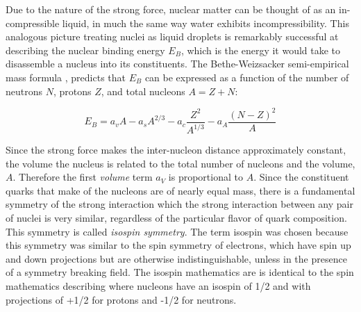 Due to the nature of the strong force, nuclear matter can be thought of as an in-compressible liquid, in much the same way water exhibits incompressibility. This analogous picture treating nuclei as liquid droplets is remarkably successful at describing the nuclear binding energy $E_{B}$, which is the energy it would take to disassemble a nucleus into its constituents. The Bethe-Weizsacker semi-empirical mass formula \cite{awayforward}, predicts that $E_{B}$ can be expressed as a function of the number of neutrons $N$, protons $Z$, and total nucleons $A = Z + N$:
 
\begin{equation}
E_{B} = a_vA - a_s A^{2/3} - a_c \frac{Z^2}{A^{1/3}} - a_A \frac{(N - Z)^2}{A}
\label{eq:semiEmp}
\end{equation}

Since the strong force makes the inter-nucleon distance approximately constant, the volume the nucleus is related to the total number of nucleons and the volume, $A$. Therefore the first \emph{volume} term $a_V$ is proportional to $A$. Since the  constituent quarks that make of the nucleons are of nearly equal mass, there is a fundamental symmetry of the strong interaction which the strong interaction between any pair of nuclei is very similar, regardless of the particular flavor of quark composition. This symmetry is called \emph{isospin symmetry}. The term isospin was chosen because this symmetry was similar to the spin symmetry of electrons, which have spin up and down projections but are otherwise indistinguishable, unless in the presence of a symmetry breaking field.  The isospin mathematics are is identical to the spin mathematics describing where nucleons have an isospin of 1/2 and with projections of  +1/2 for protons and -1/2 for neutrons. 

